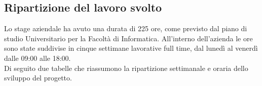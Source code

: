 \subsection{Ripartizione del lavoro svolto}
Lo stage aziendale ha avuto una durata di 225 ore, come previsto dal piano di studio Universitario per la Facoltà di Informatica. All’interno dell’azienda le ore sono state suddivise in cinque settimane lavorative full time, dal lunedì al venerdì dalle 09:00 alle 18:00.\\
Di seguito due tabelle che riassumono la ripartizione settimanale e oraria dello sviluppo del progetto.\\

